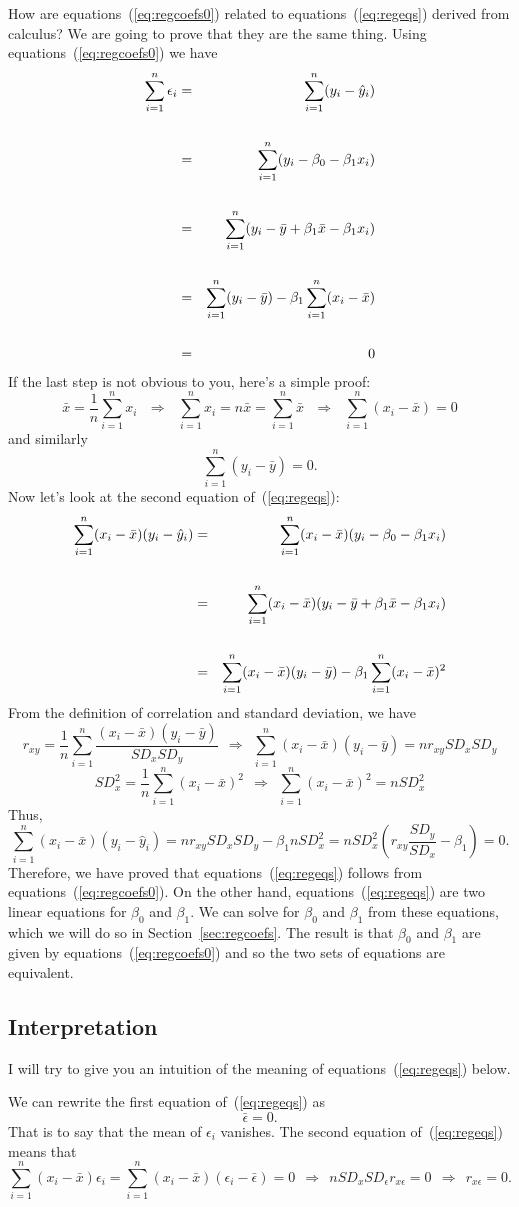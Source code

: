 \documentclass[11pt]{article}
\newcommand{\beq}{\begin{equation}}
\newcommand{\eeq}{\end{equation}}
\newcommand{\beqn}{\begin{eqnarray}}
\newcommand{\eeqn}{\end{eqnarray}}
\begin{document}
How are equations~(\ref{eq:regcoefs0}) related to equations~(\ref{eq:regeqs}) derived 
from calculus? We are going to prove that they are the same thing. 
Using equations~(\ref{eq:regcoefs0}) we have 
\beqn
  \sum_{i=1}^n \epsilon_i  &=& \sum_{i=1}^n (y_i - \hat{y}_i) \cr \cr 
&=& \sum_{i=1}^n (y_i - \beta_0 - \beta_1 x_i) \cr \cr 
&=& \sum_{i=1}^n (y_i - \bar{y} + \beta_1 \bar{x} - \beta_1 x_i) \cr \cr 
&=& \sum_{i=1}^n (y_i - \bar{y}) - \beta_1 \sum_{i=1}^n (x_i-\bar{x}) \cr \cr 
&=& 0 \nonumber 
\eeqn
If the last step is not obvious to you, here's a simple proof: 
\[
  \bar{x} = \frac{1}{n}\sum_{i=1}^n x_i \ \ \ \Rightarrow \ \ \ 
  \sum_{i=1}^n x_i = n \bar{x} = \sum_{i=1}^n \bar{x} \ \ \ \Rightarrow \ \ \ 
  \sum_{i=1}^n (x_i-\bar{x}) = 0 
\]
and similarly 
\[
  \sum_{i=1}^n (y_i-\bar{y}) = 0.
\]
Now let's look at the second equation of~(\ref{eq:regeqs}): 
\beqn
  \sum_{i=1}^n (x_i-\bar{x})(y_i-\hat{y}_i) &=& \sum_{i=1}^n (x_i-\bar{x})(y_i-\beta_0-\beta_1 x_i)\cr \cr 
&=& 
\sum_{i=1}^n 
(x_i-\bar{x})(y_i - \bar{y} + \beta_1 \bar{x} - \beta_1 x_i) \cr \cr 
&=& \sum_{i=1}^n (x_i-\bar{x})(y_i - \bar{y}) - \beta_1 \sum_{i=1}^n (x_i-\bar{x})^2 
\nonumber
\eeqn
From the definition of correlation and standard deviation, we have 
\[
  r_{xy} = \frac{1}{n} \sum_{i=1}^n \frac{(x_i-\bar{x})(y_i - \bar{y})}{SD_x SD_y} 
 \ \ \Rightarrow \ \ \sum_{i=1}^n (x_i-\bar{x})(y_i - \bar{y}) = n r_{xy} SD_x SD_y 
\]
\[
  SD_x^2 = \frac{1}{n} \sum_{i=1}^n (x_i-\bar{x})^2 \ \ \Rightarrow \ \ 
\sum_{i=1}^n (x_i-\bar{x})^2 = n SD_x^2 
\]
Thus, 
\[
  \sum_{i=1}^n (x_i-\bar{x})(y_i-\hat{y}_i) = nr_{xy}SD_x SD_y - \beta_1 n SD_x^2 
= n SD_x^2 \left( r_{xy} \frac{SD_y}{SD_x} - \beta_1 \right) = 0.
\]
Therefore, we have proved that equations~(\ref{eq:regeqs}) follows from 
equations~(\ref{eq:regcoefs0}). On the other hand, equations~(\ref{eq:regeqs}) 
are two linear equations for $\beta_0$ and $\beta_1$. We can solve for 
$\beta_0$ and $\beta_1$ from these equations, which we will do so in 
Section~\ref{sec:regcoefs}. 
The result is that $\beta_0$ and $\beta_1$ are given by equations~(\ref{eq:regcoefs0}) 
and so the two sets of equations are equivalent. 

\subsection{Interpretation}

I will try to give you an intuition of the meaning of equations~(\ref{eq:regeqs}) below. 

We can rewrite the first equation of~(\ref{eq:regeqs}) as
\beq
  \bar{\epsilon} = 0 .
\eeq
That is to say that the mean of $\epsilon_i$ vanishes. The second equation 
of~(\ref{eq:regeqs}) means that 
\[
\sum_{i=1}^n (x_i-\bar{x}) \epsilon_i = \sum_{i=1}^n (x_i-\bar{x}) (\epsilon_i-\bar{\epsilon}) = 0 
\ \ \Rightarrow \ \ n SD_x SD_\epsilon r_{x\epsilon} = 0 \ \ \Rightarrow 
\ \ r_{x\epsilon} = 0 .
\]
\end{document}

